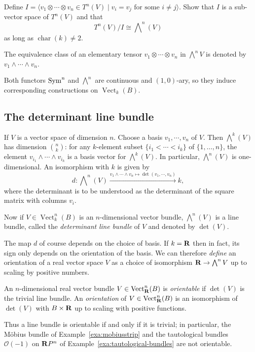 \documentclass[a4paper,openany]{scrbook}
\DeclareMathOperator{\Vect}{Vect}
\DeclareMathOperator{\chr}{char}
\newcommand{\exterior}{\bigwedge\nolimits}
\begin{document}
\begin{exer}
Define $I = \langle v_1 \otimes \cdots \otimes v_n \in T^n(V) \mid v_i=v_j \text{ for some }i\neq j\rangle$. Show that $I$ is a sub-vector space of $T^n(V)$ and that
\[
T^n(V)/I \cong \exterior^n(V)
\]
as long as $\chr(k) \neq 2$.
\end{exer}

The equivalence class of an elementary tensor $v_1 \otimes \cdots \otimes v_n$ in $\exterior^nV$ is denoted by $v_1 \wedge \cdots \wedge v_n$. 

Both functors $\operatorname{Sym}^n$ and $\exterior^n$ are continuous and $(1,0)$-ary, so they induce corresponding constructions on $\Vect_k(B)$.

\subsection{The determinant line bundle}

If $V$ is a vector space of dimension $n$. Choose a basis $v_1,\cdots,v_n$ of $V$. Then $\exterior^k(V)$ has dimension $n \choose k$: for any $k$-element subset $\{i_1<\cdots<i_k\}$ of $\{1,\dots,n\}$, the element $v_{i_1} \wedge \cdots \wedge v_{i_k}$ is a basis vector for $\exterior^k(V)$. In particular, $\exterior^n(V)$ is one-dimensional. An isomorphism with $k$ is given by
\[
d\colon \exterior^n(V) \xrightarrow{v_1 \wedge \cdots \wedge v_n \mapsto \det(v_1,\cdots,v_n)} k,
\]
where the determinant is to be understood as the determinant of the square matrix with columns $v_i$. 

Now if $V \in \Vect^n_k(B)$ is an $n$-dimensional vector bundle, $\exterior^n(V)$ is a line bundle, called the \emph{determinant line bundle} of $V$ and denoted by $\det(V)$.

The map $d$ of course depends on the choice of basis. If $k=\mathbf R$ then in fact, its sign only depends on the orientation of the basis. We can therefore \emph{define} an orientation of a real vector space $V$ as a choice of isomorphism $\R \to \exterior^nV$ up to scaling by positive numbers.

\begin{defn}
An $n$-dimensional real vector bundle $V \in \Vect^n_\R(B)$ is \emph{orientable} if $\det(V)$ is the trivial line bundle. An \emph{orientation} of $V \in \Vect^n_\R(B)$ is an isomorphism of $\det(V)$ with $B \times \mathbf R$ up to scaling with positive functions.
\end{defn}

Thus a line bundle is orientable if and only if it is trivial; in particular, the Möbius bundle of Example~\ref{exa:mobiusstrip} and the tautological bundles $\mathcal O(-1)$ on $\mathbf R P^n$ of Example~\ref{exa:tautological-bundles} are not orientable.
\end{document}
